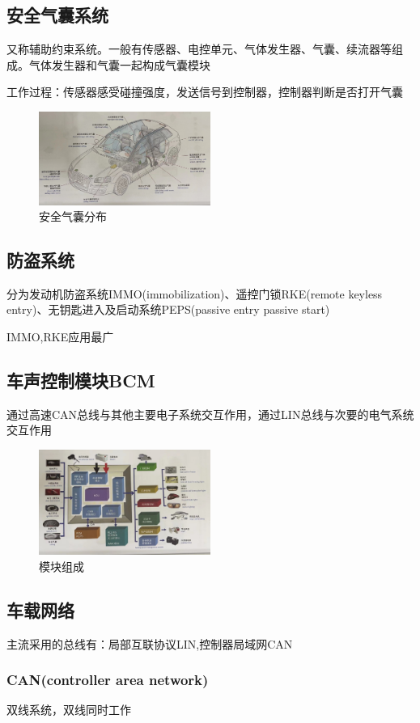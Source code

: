 \subsection{安全气囊系统}
	又称辅助约束系统。一般有传感器、电控单元、气体发生器、气囊、续流器等组成。气体发生器和气囊一起构成气囊模块
	
	工作过程：传感器感受碰撞强度，发送信号到控制器，控制器判断是否打开气囊
	\begin{figure}[htbp]
		\centering
		\caption*{安全气囊分布}
		\includegraphics[width=0.5\textwidth]{5-23}
	\end{figure}
\subsection{防盗系统}
	分为发动机防盗系统IMMO(immobilization)、遥控门锁RKE(remote keyless entry)、无钥匙进入及启动系统PEPS(passive entry passive start)
	
	IMMO,RKE应用最广
\subsection{车声控制模块BCM}
	通过高速CAN总线与其他主要电子系统交互作用，通过LIN总线与次要的电气系统交互作用
	\begin{figure}[htbp]
		\centering
		\caption*{模块组成}
		\includegraphics[width=0.5\textwidth]{5-24}
	\end{figure}
\subsection{车载网络}
	主流采用的总线有：局部互联协议LIN,控制器局域网CAN
	\subsubsection{CAN(controller area network)}
		双线系统，双线同时工作
	
